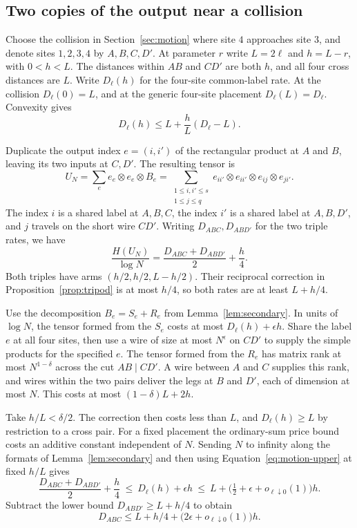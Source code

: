 \subsection{Two copies of the output near a collision}

Choose the collision in Section~\ref{sec:motion} where site \(4\)
approaches site \(3\), and denote sites \(1,2,3,4\) by \(A,B,C,D'\).
At parameter \(r\) write \(L=2\ell\) and \(h=L-r\), with \(0<h<L\).
The distances within \(AB\) and \(CD'\) are both \(h\), and all four
cross distances are \(L\). Write \(D_\ell(h)\) for the four-site
common-label rate. At the collision \(D_\ell(0)=L\), and at the
generic four-site placement \(D_\ell(L)=D_\ell\). Convexity gives
\[
                   D_\ell(h)\le L+\frac hL(D_\ell-L).
\]

Duplicate the output index \(e=(i,i')\) of the rectangular product at
\(A\) and \(B\), leaving its two inputs at \(C,D'\). The resulting tensor is
\[
 U_N=\sum_e e_e\otimes e_e\otimes B_e
     =\sum_{\substack{1\le i,i'\le s\\1\le j\le q}}
        e_{ii'}\otimes e_{ii'}\otimes e_{ij}\otimes e_{ji'} .
\]
The index \(i\) is a shared label at \(A,B,C\), the index \(i'\) is a
shared label at \(A,B,D'\), and \(j\) travels on the short wire \(CD'\).
Writing \(D_{ABC},D_{ABD'}\) for the two triple rates, we have
\[
   \frac{H(U_N)}{\log N}=\frac{D_{ABC}+D_{ABD'}}2+\frac h4 .
\]
Both triples have arms \((h/2,h/2,L-h/2)\). Their reciprocal
correction in Proposition~\ref{prop:tripod} is at most \(h/4\), so
both rates are at least \(L+h/4\).

Use the decomposition \(B_e=S_e+R_e\) from Lemma~\ref{lem:secondary}.
In units of \(\log N\), the tensor formed from the \(S_e\) costs at
most \(D_\ell(h)+\epsilon h\). Share the label \(e\) at all four sites,
then use a wire of size at most \(N^\epsilon\) on \(CD'\) to supply
the simple products for the specified \(e\). The tensor formed from
the \(R_e\) has matrix rank at most \(N^{1-\delta}\) across the cut
\(AB\mid CD'\). A wire between \(A\) and \(C\) supplies this rank, and
wires within the two pairs deliver the legs at \(B\) and \(D'\), each
of dimension at most \(N\). This costs at most \((1-\delta)L+2h\).

Take \(h/L<\delta/2\). The correction then costs less than \(L\), and
\(D_\ell(h)\ge L\) by restriction to a cross pair. For a fixed placement
the ordinary-sum price bound costs an additive constant independent of
\(N\). Sending \(N\) to infinity along the formats of Lemma~\ref{lem:secondary} and
then using Equation~\eqref{eq:motion-upper} at fixed \(h/L\) gives
\[
  \frac{D_{ABC}+D_{ABD'}}2+\frac h4
  \ \le\ D_\ell(h)+\epsilon h
  \ \le\ L+\bigl(\tfrac12+\epsilon+o_{\ell\downarrow0}(1)\bigr)h .
\]
Subtract the lower bound \(D_{ABD'}\ge L+h/4\) to obtain
\[
        D_{ABC}\le L+h/4+\bigl(2\epsilon+o_{\ell\downarrow0}(1)\bigr)h.
\]


